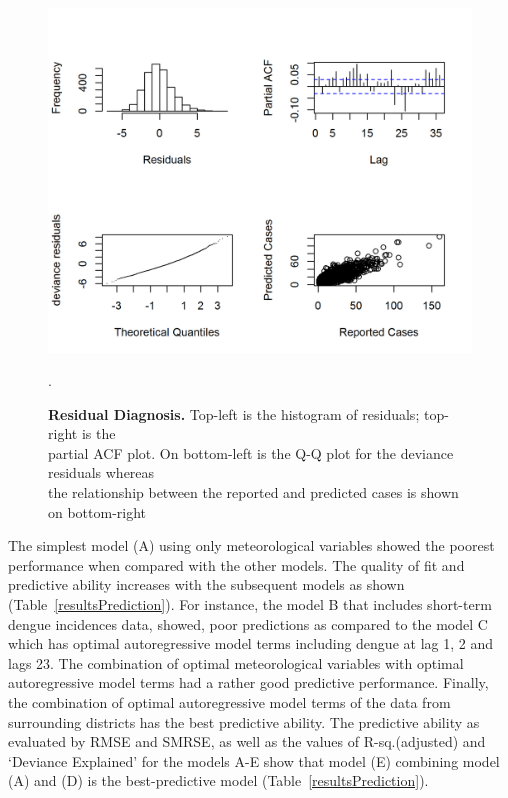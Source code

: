 \documentclass{bmcart}
\begin{document}
\begin{figure}[h!]
	\begin{center}
		\includegraphics[width= 1.0\textwidth]{19-resid-diagnosis}
		\caption{\textbf{Residual Diagnosis.} Top-left is the histogram of residuals; top-right is the \\ partial ACF plot. On bottom-left is the Q-Q plot for the deviance residuals whereas \\ the relationship between the reported and predicted cases is shown on bottom-right}.
		\label{figure:resid-diagnosis}
	\end{center}
\end{figure}


The simplest model (A) using only meteorological variables showed the poorest performance when compared with the other models. The quality of fit and predictive ability increases with the subsequent models 
as shown (Table~\ref{resultsPrediction}).  For instance, the model B that includes short-term dengue incidences data, showed, poor predictions as compared to the model C which has optimal autoregressive model terms including dengue at lag 1, 2 and lags 23. The combination of optimal meteorological variables with optimal autoregressive model terms had a 
rather good predictive performance. Finally, the combination of optimal autoregressive model terms of the data from surrounding districts has the best predictive ability. The predictive ability
as evaluated by RMSE and SMRSE, as well as the values of R-sq.(adjusted) and `Deviance Explained' for the models A-E show that model (E) combining model (A) and (D) is the best-predictive model (Table~\ref{resultsPrediction}).
\end{document}
